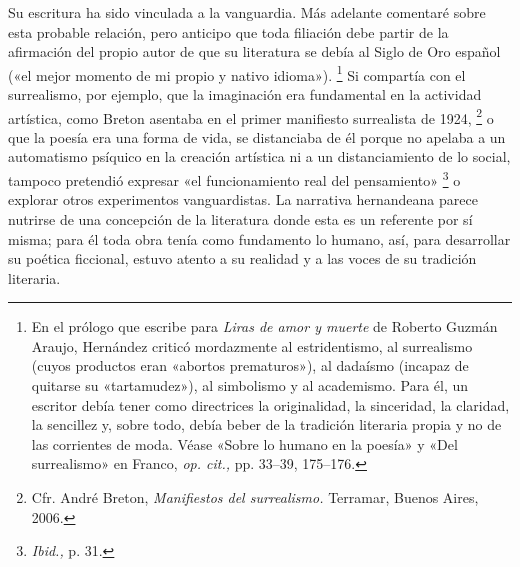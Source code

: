 \documentclass[14pt,twoside,final]{extbook} %
\let\oldfootnote\footnote
\renewcommand\footnote[1]{%
\oldfootnote{\hspace{1mm}#1}}
\begin{document}
Su escritura ha sido vinculada a la vanguardia. Más adelante comentaré sobre esta probable relación, pero anticipo que toda filiación debe partir de la afirmación del propio autor de que su literatura se debía al Siglo de Oro español («el mejor momento de mi propio y nativo idioma»).\footnote{En el prólogo que escribe para \emph{Liras de amor y muerte} de Roberto Guzmán Araujo, Hernández criticó mordazmente al estridentismo, al surrealismo (cuyos productos eran «abortos prematuros»), al dadaísmo (incapaz de quitarse su «tartamudez»), al simbolismo y al academismo. Para él, un escritor debía tener como directrices la originalidad, la sinceridad, la claridad, la sencillez y, sobre todo, debía beber de la tradición literaria propia y no de las corrientes de moda. Véase «Sobre lo humano en la poesía» y «Del surrealismo» en Franco, \emph{op. cit.,} pp. 33--39, 175--176.} Si compartía con el surrealismo, por ejemplo, que la imaginación era fundamental en la actividad artística, como Breton asentaba en el primer manifiesto surrealista de 1924,\footnote{Cfr. André Breton, \emph{Manifiestos del surrealismo.} Terramar, Buenos Aires, 2006.} o que la poesía era una forma de vida, se distanciaba de él porque no apelaba a un automatismo psíquico en la creación artística ni a un distanciamiento de lo social, tampoco pretendió expresar «el funcionamiento real del pensamiento»\footnote{\emph{Ibid.,} p. 31.} o explorar otros experimentos vanguardistas. La narrativa hernandeana parece nutrirse de una concepción de la literatura donde esta es un referente por sí misma; para él toda obra tenía como fundamento lo humano, así, para desarrollar su poética ficcional, estuvo atento a su realidad y a las voces de su tradición literaria.
\end{document}
